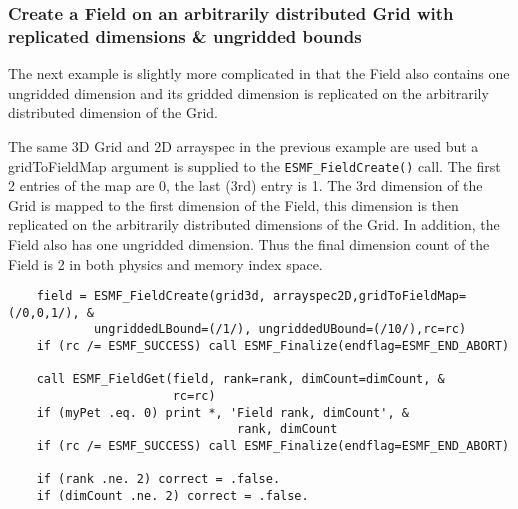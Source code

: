 
  \subsubsection{Create a Field on an arbitrarily distributed Grid with replicated dimensions \& ungridded bounds}
  \label{sec:field:usage:createArbGridRep}
  
    The next example is slightly more complicated in
    that the Field also contains one ungridded dimension and its gridded dimension
    is replicated on the arbitrarily distributed dimension of the Grid.
   
    The same 3D Grid and 2D arrayspec in the previous example
    are used but a gridToFieldMap argument
    is supplied to the {\tt ESMF\_FieldCreate()} call. The first 2 entries of
    the map are 0, the last (3rd) entry is 1. The 3rd dimension of the Grid is
    mapped to the first dimension of the Field, this dimension is then replicated
    on the arbitrarily distributed dimensions of the Grid. In addition, the
    Field also has one ungridded dimension. Thus the final dimension count of the
    Field is 2 in both physics and memory index space.
   

 \begin{verbatim}
    field = ESMF_FieldCreate(grid3d, arrayspec2D,gridToFieldMap=(/0,0,1/), &
            ungriddedLBound=(/1/), ungriddedUBound=(/10/),rc=rc)
    if (rc /= ESMF_SUCCESS) call ESMF_Finalize(endflag=ESMF_END_ABORT)
  
    call ESMF_FieldGet(field, rank=rank, dimCount=dimCount, &
                       rc=rc)
    if (myPet .eq. 0) print *, 'Field rank, dimCount', &
                                rank, dimCount
    if (rc /= ESMF_SUCCESS) call ESMF_Finalize(endflag=ESMF_END_ABORT)
  
    if (rank .ne. 2) correct = .false.
    if (dimCount .ne. 2) correct = .false.  
 
\end{verbatim}

\setlength{\parskip}{\oldparskip}
\setlength{\parindent}{\oldparindent}
\setlength{\baselineskip}{\oldbaselineskip}
